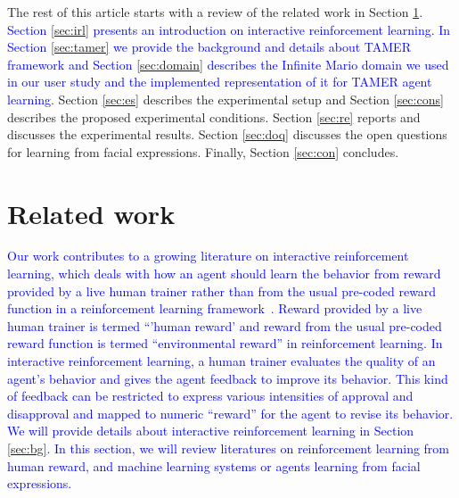 The rest of this article starts with a review of the related work in Section \ref{sec:rw}. \textcolor{blue}{Section \ref{sec:irl} presents an introduction on interactive reinforcement learning. In Section \ref{sec:tamer} we provide the background and details about TAMER framework and Section \ref{sec:domain} describes the Infinite Mario domain we used in our user study and the implemented representation of it for TAMER agent learning}. Section \ref{sec:es} describes the experimental setup and Section \ref{sec:cons} describes the proposed experimental conditions. Section \ref{sec:re} reports and discusses the experimental results. Section \ref{sec:doq} discusses the open questions for learning from facial expressions. Finally, Section \ref{sec:con} concludes. 

\section{Related work}
\label{sec:rw}

\textcolor{blue}{Our work contributes to a growing literature on interactive reinforcement learning, which deals with how an agent should learn the behavior from reward provided by a live human trainer rather than from the usual pre-coded reward function in a reinforcement learning framework~\cite{isbell2001social,knox2009interactively,tenorio2010dynamic,pilarski2011online,suay2011effect}. Reward provided by a live human trainer is termed ``'human reward' and reward from the usual pre-coded reward function is termed  ``environmental reward'' in reinforcement learning. %
In interactive reinforcement learning, a human trainer evaluates the quality of an agent's behavior and gives the agent feedback to improve its behavior. This kind of feedback can be restricted to express various intensities of approval and disapproval and mapped to numeric ``reward'' for the agent to revise its behavior. %
We will provide details about interactive reinforcement learning in Section \ref{sec:bg}. 
In this section, we will review literatures on reinforcement learning from human reward, and machine learning systems or agents learning from facial expressions.}

